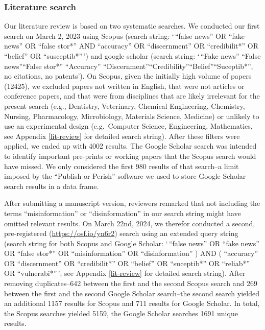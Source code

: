\documentclass[
  doc,floatsintext]{apa6}
\begin{document}
\subsubsection{Literature search}\label{literature-search}

Our literature review is based on two systematic searches. We conducted our first search on March 2, 2023 using Scopus (search string: `\,``false news'' OR ``fake news'' OR ``false stor*'' AND ``accuracy'' OR ``discernment'' OR ``credibilit*'' OR ``belief'' OR ``susceptib*''\,') and google scholar (search string: `\,``Fake news'' \textbar{} ``False news''\textbar{}``False stor*'' ``Accuracy'' \textbar{} ``Discernment''\textbar{}``Credibility''\textbar{}``Belief''\textbar{}``Suceptib*'', no citations, no patents'). On Scopus, given the initially high volume of papers (12425), we excluded papers not written in English, that were not articles or conference papers, and that were from disciplines that are likely irrelevant for the present search (e.g., Dentistry, Veterinary, Chemical Engineering, Chemistry, Nursing, Pharmacology, Microbiology, Materials Science, Medicine) or unlikely to use an experimental design (e.g.~Computer Science, Engineering, Mathematics, see Appendix \ref{lit-review} for detailed search string). After these filters were applied, we ended up with 4002 results. The Google Scholar search was intended to identify important pre-prints or working papers that the Scopus search would have missed. We only considered the first 980 results of that search--a limit imposed by the ``Publish or Perish'' software we used to store Google Scholar search results in a data frame.

After submitting a manuscript version, reviewers remarked that not including the terms ``misinformation'' or ``disinformation'' in our search string might have omitted relevant results. On March 22nd, 2024, we therefor conducted a second, pre-registered (\url{https://osf.io/yn6r2}) search using an extended query string (search string for both Scopus and Google Scholar: `\,``false news'' OR ``fake news'' OR ``false stor*'' OR ``misinformation'' OR ``disinformation'' ) AND ( ``accuracy'' OR ``discernment'' OR ``credibilit*'' OR ``belief'' OR ``suceptib*'' OR ``reliab*'' OR ``vulnerabi*''\,'; see Appendix \ref{lit-review} for detailed search string). After removing duplicates--642 between the first and the second Scopus search and 269 between the first and the second Google Scholar search--the second search yielded an additional 1157 results for Scopus and 711 results for Google Scholar. In total, the Scopus searches yielded 5159, the Google Scholar searches 1691 unique results.
\end{document}
